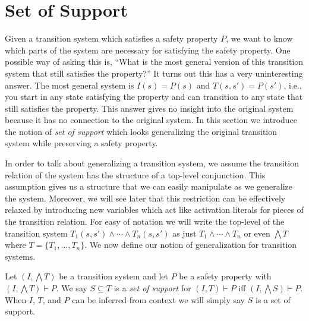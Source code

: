 \section{Set of Support}
\label{sec:support}


Given a transition system which satisfies a safety property $P$, we
want to know which parts of the system are necessary for satisfying
the safety property. One possible way of asking this is, ``What is the
most general version of this transition system that still satisfies
the property?'' It turns out this has a very uninteresting answer. The
most general system is $I(s) = P(s)$ and $T(s, s') = P(s')$, i.e., you
start in any state satisfying the property and can transition to any
state that still satisfies the property. This answer gives no insight
into the original system because it has no connection to the original
system. In this section we introduce the notion of {\em set of
  support} which looks generalizing the original transition system
while preserving a safety property.

In order to talk about generalizing a transition system, we assume the
transition relation of the system has the structure of a top-level
conjunction. This assumption gives us a structure that we can easily
manipulate as we generalize the system. Moreover, we will see later
that this restriction can be effectively relaxed by introducing new
variables which act like activation literals for pieces of the
transition relation. For easy of notation we will write the top-level
of the transition system $T_1(s, s') \land \cdots \land T_n(s, s')$ as
just $T_1 \land \cdots \land T_n$ or even $\bigwedge T$ where $T =
\{T_1, \ldots, T_n\}$. We now define our notion of generalization for
transition systems.


\begin{definition}
  \label{def:set-of-support}
  Let $(I, \bigwedge T)$ be a transition system and let $P$ be a
  safety property with $(I, \bigwedge T)\vdash P$. We say $S \subseteq
  T$ is a {\em set of support} for $(I, T)\vdash P$ iff $(I, \bigwedge
  S) \vdash P$. When $I$, $T$, and $P$ can be inferred from context we
  will simply say $S$ is a set of support.
\end{definition}

